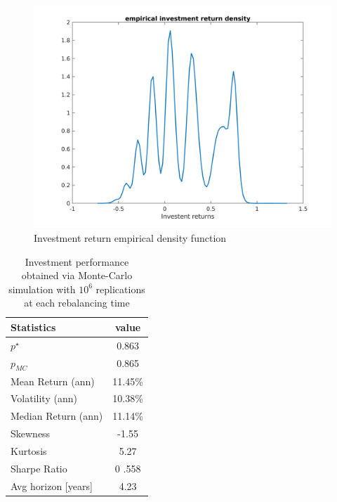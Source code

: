 \begin{figure}[h]
	\includegraphics[scale = 0.4]{Images/Densitybasic}
	\caption{Investment return empirical density function}
	\label{fig:empirical density_basic}
\end{figure}

\begin{table}
	\begin{tabular}{@{}lc@{}}
		\toprule
		Statistics & value  \\
		\midrule
		$p^{\star}$ & 0.863\\
		\addlinespace[0.5em]	
		$p_{MC}$ & 0.865\\
		\addlinespace[0.5em]
		Mean Return (ann) & 11.45\%\\
		\addlinespace[0.5em]
		Volatility (ann) & 10.38\%\\
		\addlinespace[0.5em]
		Median Return (ann) & 11.14\%\\
		\addlinespace[0.5em]
		Skewness & -1.55\\
		\addlinespace[0.5em]
		Kurtosis & 5.27\\
		\addlinespace[0.5em]
		Sharpe Ratio & 0
		.558\\
		\addlinespace[0.5em]
		Avg horizon [years] & 4.23 \\	
		\bottomrule
	\end{tabular}
	\caption{Investment performance obtained via Monte-Carlo simulation with $10^6$ replications at each rebalancing time}
	\label{tab:performance_basic}
\end{table}
